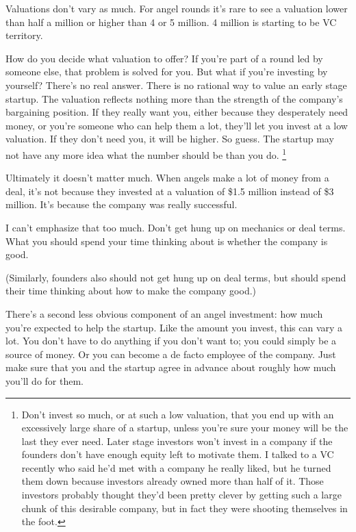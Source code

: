 Valuations don't vary as much. For angel rounds it's rare to see a
valuation lower than half a million or higher than 4 or 5 million. 4
million is starting to be VC territory.

How do you decide what valuation to offer? If you're part of a round led
by someone else, that problem is solved for you. But what if you're
investing by yourself? There's no real answer. There is no rational way
to value an early stage startup. The valuation reflects nothing more
than the strength of the company's bargaining position. If they really
want you, either because they desperately need money, or you're someone
who can help them a lot, they'll let you invest at a low valuation. If
they don't need you, it will be higher. So guess. The startup may not
have any more idea what the number should be than you do.
\footnote{Don't invest so much, or at such a low valuation, that you end
up with an excessively large share of a startup, unless you're sure your
money will be the last they ever need. Later stage investors won't
invest in a company if the founders don't have enough equity left to
motivate them. I talked to a VC recently who said he'd met with a
company he really liked, but he turned them down because investors
already owned more than half of it. Those investors probably thought
they'd been pretty clever by getting such a large chunk of this
desirable company, but in fact they were shooting themselves in the
foot.}

Ultimately it doesn't matter much. When angels make a lot of money from
a deal, it's not because they invested at a valuation of \$1.5 million
instead of \$3 million. It's because the company was really successful.

I can't emphasize that too much. Don't get hung up on mechanics or deal
terms. What you should spend your time thinking about is whether the
company is good.

(Similarly, founders also should not get hung up on deal terms, but
should spend their time thinking about how to make the company good.)

There's a second less obvious component of an angel investment: how much
you're expected to help the startup. Like the amount you invest, this
can vary a lot. You don't have to do anything if you don't want to; you
could simply be a source of money. Or you can become a de facto employee
of the company. Just make sure that you and the startup agree in advance
about roughly how much you'll do for them.

